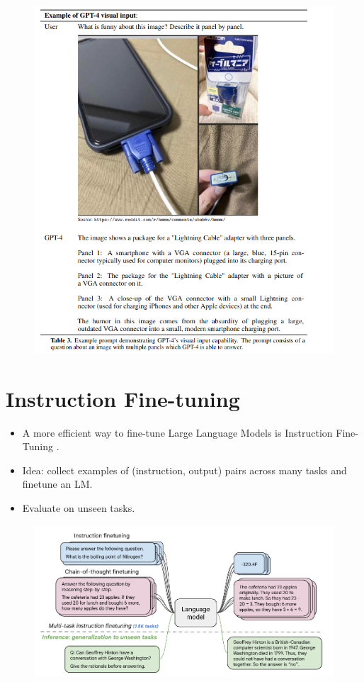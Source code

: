 \begin{figure}[h]
	\includegraphics[scale = 0.35]{pics/gpt4.png}
\end{figure}

\section{Instruction Fine-tuning}
\begin{itemize}
\item A more efficient way to fine-tune Large Language Models is Instruction Fine-Tuning  \cite{chung2022scaling}.
\item Idea: collect examples of (instruction, output) pairs across many tasks and finetune an LM.
\item Evaluate on unseen tasks.
\end{itemize}

\begin{figure}[h]
	\includegraphics[scale = 0.35]{pics/instructionfinetuning.png}
\end{figure}


